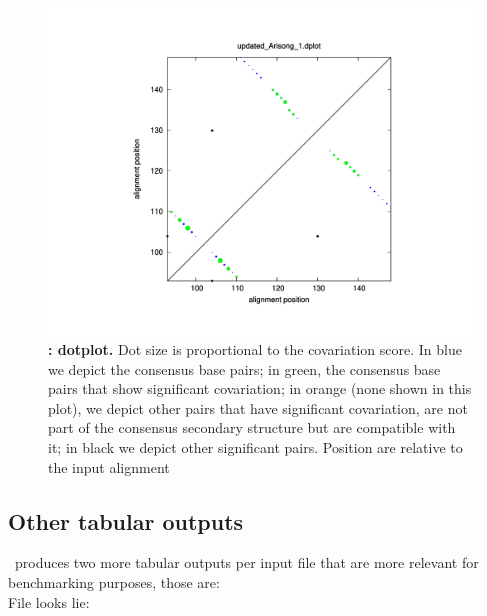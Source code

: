  \begin{figure}
   \includegraphics[scale=0.60]{Arisong_dplot.pdf}
 \caption{\small\textbf{:
     dotplot.}  Dot size is proportional to the covariation score. In
   blue we depict the consensus base pairs; in green, the consensus
   base pairs that show significant covariation; in orange (none shown
   in this plot), we depict other pairs that have significant
   covariation, are not part of the consensus secondary structure but
   are compatible with it; in black we depict other significant pairs.
   Position are relative to the input alignment}
 \label{fig:dplot}
 \end{figure}



 \clearpage
 \subsection{Other tabular outputs}

 \rscape\ produces two more tabular outputs per input file that are
 more relevant for benchmarking purposes, those are:\\

 File  looks lie:

